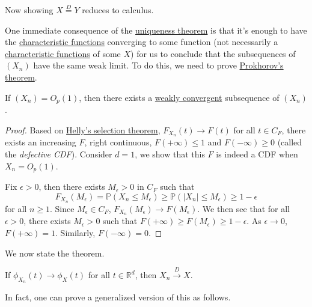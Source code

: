 \begin{note}
	Now showing \(X \overset{D}{=} Y\) reduces to calculus.
\end{note}

One immediate consequence of the \hyperref[thm:characteristic-function-uniqueness]{uniqueness theorem} is that it's enough to have the \hyperref[def:characteristic-function]{characteristic functions} converging to some function (not necessarily a \hyperref[def:characteristic-function]{characteristic functions} of some \(X\)) for us to conclude that the subsequences of \((X_n)\) have the same weak limit. To do this, we need to prove \hyperref[thm:Prokhorov]{Prokhorov's theorem}.

\begin{theorem}\label{thm:Prokhorov}
	If \((X_n) = O_p(1)\), then there exists a \hyperref[def:converge-weakly]{weakly convergent} subsequence of \((X_n)\).
\end{theorem}
\begin{proof}%
	Based on \href{https://en.wikipedia.org/wiki/Helly%27s_selection_theorem}{Helly's selection theorem}, \(F_{X_n}(t) \to F(t)\) for all \(t \in C_F\), there exists an increasing \(F\), right continuous, \(F(+\infty ) \leq 1\) and \(F(-\infty ) \geq 0\) (called the \emph{defective CDF}). Consider \(d = 1\), we show that this \(F\) is indeed a CDF when \(X_n = O_p(1)\).

	Fix \(\epsilon > 0\), then there exists \(M_{\epsilon } > 0\) in \(C_F\) such that
	\[
		F_{X_n}(M_{\epsilon } )
		=\mathbb{P} (X_n \leq M_{\epsilon } )
		\geq \mathbb{P} (\vert X_n \vert \leq M_{\epsilon } )
		\geq 1 - \epsilon
	\]
	for all \(n \geq 1\). Since \(M_{\epsilon } \in C_F\), \(F_{X_n}(M_{\epsilon } ) \to F(M_{\epsilon } )\). We then see that for all \(\epsilon > 0\), there exists \(M_{\epsilon } > 0 \) such that \(F(+\infty ) \geq F(M_{\epsilon } ) \geq 1 - \epsilon \). As \(\epsilon \to 0\), \(F(+\infty ) = 1\). Similarly, \(F(-\infty ) = 0\).
\end{proof}

We now state the theorem.

\begin{theorem}
	If \(\phi _{X_n}(t) \to \phi _X(t)\) for all \(t \in \mathbb{R} ^d\), then \(X_n \overset{D}{\to } X\).
\end{theorem}

In fact, one can prove a generalized version of this as follows.

